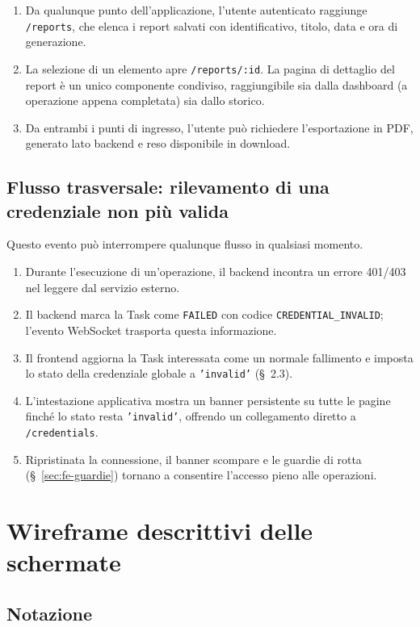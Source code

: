 \documentclass[11pt,a4paper]{article}
\begin{document}
\begin{enumerate}
    \item Da qualunque punto dell'applicazione, l'utente autenticato raggiunge \texttt{/reports}, che elenca i report salvati con identificativo, titolo, data e ora di generazione.
    \item La selezione di un elemento apre \texttt{/reports/:id}. La pagina di dettaglio del report è un unico componente condiviso, raggiungibile sia dalla dashboard (a operazione appena completata) sia dallo storico.
    \item Da entrambi i punti di ingresso, l'utente può richiedere l'esportazione in PDF, generato lato backend e reso disponibile in download.
\end{enumerate}

\subsection{Flusso trasversale: rilevamento di una credenziale non più valida}

Questo evento può interrompere qualunque flusso in qualsiasi momento.

\begin{enumerate}
    \item Durante l'esecuzione di un'operazione, il backend incontra un errore 401/403 nel leggere dal servizio esterno.
    \item Il backend marca la Task come \texttt{FAILED} con codice \texttt{CREDENTIAL\_INVALID}; l'evento WebSocket trasporta questa informazione.
    \item Il frontend aggiorna la Task interessata come un normale fallimento e imposta lo stato della credenziale globale a \texttt{'invalid'} (\S~2.3).
    \item L'intestazione applicativa mostra un banner persistente su tutte le pagine finché lo stato resta \texttt{'invalid'}, offrendo un collegamento diretto a \texttt{/credentials}.
    \item Ripristinata la connessione, il banner scompare e le guardie di rotta (\S~\ref{sec:fe-guardie}) tornano a consentire l'accesso pieno alle operazioni.
\end{enumerate}

\section{Wireframe descrittivi delle schermate}

\subsection{Notazione}
\end{document}
